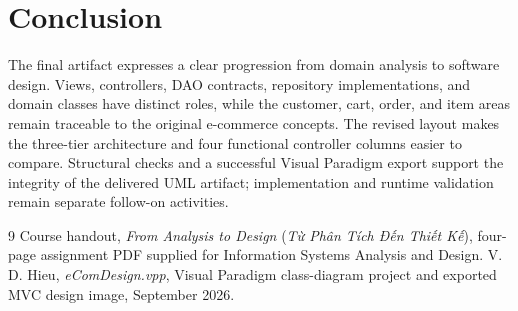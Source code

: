 \documentclass[12pt,a4paper,oneside]{report}
\begin{document}
\chapter{Conclusion}
The final artifact expresses a clear progression from domain analysis to software design. Views, controllers, DAO contracts, repository implementations, and domain classes have distinct roles, while the customer, cart, order, and item areas remain traceable to the original e-commerce concepts. The revised layout makes the three-tier architecture and four functional controller columns easier to compare. Structural checks and a successful Visual Paradigm export support the integrity of the delivered UML artifact; implementation and runtime validation remain separate follow-on activities.

\begin{thebibliography}{9}
 Course handout, \textit{From Analysis to Design} (\textit{Từ Phân Tích Đến Thiết Kế}), four-page assignment PDF supplied for Information Systems Analysis and Design.
 V. D. Hieu, \textit{eComDesign.vpp}, Visual Paradigm class-diagram project and exported MVC design image, September 2026.
\end{thebibliography}
\end{document}
